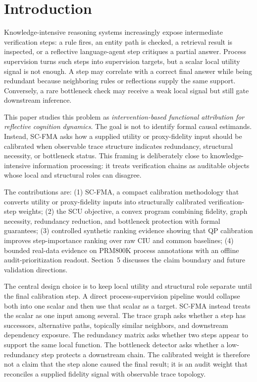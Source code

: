 \documentclass[a4paper,fleqn]{cas-sc}
\begin{document}
\maketitle

\section{Introduction}

Knowledge-intensive reasoning systems increasingly expose intermediate verification steps: a rule fires, an entity path is checked, a retrieval result is inspected, or a reflective language-agent step critiques a partial answer. Process supervision turns such steps into supervision targets, but a scalar local utility signal is not enough. A step may correlate with a correct final answer while being redundant because neighboring rules or reflections supply the same support. Conversely, a rare bottleneck check may receive a weak local signal but still gate downstream inference.

This paper studies this problem as \emph{intervention-based functional attribution for reflective cognition dynamics}. The goal is not to identify formal causal estimands. Instead, SC-FMA asks how a supplied utility or proxy-fidelity input should be calibrated when observable trace structure indicates redundancy, structural necessity, or bottleneck status. This framing is deliberately close to knowledge-intensive information processing: it treats verification chains as auditable objects whose local and structural roles can disagree.

The contributions are: (1) SC-FMA, a compact calibration methodology that converts utility or proxy-fidelity inputs into structurally calibrated verification-step weights; (2) the SCU objective, a convex program combining fidelity, graph necessity, redundancy reduction, and bottleneck protection with formal guarantees; (3) controlled synthetic ranking evidence showing that QP calibration improves step-importance ranking over raw CIU and common baselines; (4) bounded real-data evidence on PRM800K process annotations with an offline audit-prioritization readout. Section~5 discusses the claim boundary and future validation directions.

The central design choice is to keep local utility and structural role separate until the final calibration step. A direct process-supervision pipeline would collapse both into one scalar and then use that scalar as a target. SC-FMA instead treats the scalar as one input among several. The trace graph asks whether a step has successors, alternative paths, topically similar neighbors, and downstream dependency exposure. The redundancy matrix asks whether two steps appear to support the same local function. The bottleneck detector asks whether a low-redundancy step protects a downstream chain. The calibrated weight is therefore not a claim that the step alone caused the final result; it is an audit weight that reconciles a supplied fidelity signal with observable trace topology.
\end{document}
